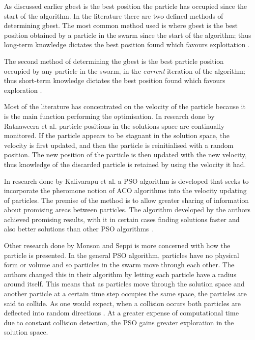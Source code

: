 As discussed earlier gbest is the best position the particle has occupied since the start of the algorithm. In the literature there are two defined methods of determining gbest. The most common method used is where gbest is the best position obtained by a particle in the swarm since the start of the algorithm; thus long-term knowledge dictates the best position found which favours exploitation \cite{CompuIntelligenceIntro,FundamentalSwarm}.

The second method of determining the gbest is the best particle position occupied by any particle in the swarm, in the \emph{current} iteration of the algorithm; thus short-term knowledge dictates the best position found which favours exploration \cite{CompuIntelligenceIntro,FundamentalSwarm}.

Most of the literature has concentrated on the velocity of the particle because it is the main function performing the optimisation. In research done by Ratnaweera et al.\cite{PSOSelfHierarch} particle positions in the solutions space are continually monitored. If the particle appears to be stagnant in the solution space, the velocity is first updated, and then the particle is reinitialised with a random position. The new position of the particle is then updated with the new velocity, thus knowledge of the discarded particle is retained by using the velocity it had\cite{PSOSelfHierarch}.

In research done by Kalivarapu et al. \cite{PSOPheromones} a \gls{PSO} algorithm is developed that seeks to incorporate the pheromone notion of \gls{ACO} algorithms into the velocity updating of particles. The premise of the method is to allow greater sharing of information about promising areas between particles. The algorithm developed by the authors achieved promising results, with it in certain cases finding solutions faster and also better solutions than other \gls{PSO} algorithms \cite{PSOPheromones}. 

Other research done by Monson and Seppi \cite{adaptPSO} is more concerned with how the particle is presented. In the general \gls{PSO} algorithm, particles have no physical form or volume and so particles in the swarm move through each other. The authors changed this in their algorithm by letting each particle have a radius around itself. This means that as particles move through the solution space and another particle at a certain time step occupies the same space, the particles are said to collide. As one would expect, when a collision occurs both particles are deflected into random directions \cite{adaptPSO}. At a greater expense of computational time due to constant collision detection, the \gls{PSO} gains greater exploration in the solution space. 

